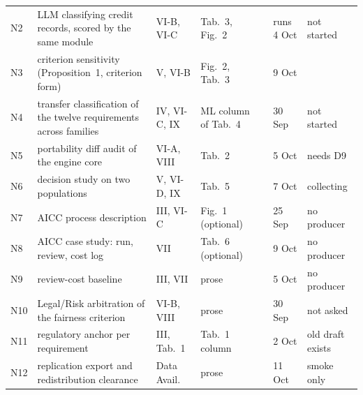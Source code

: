 {\begin{tabularx}{\textwidth}{@{}l X L{1.3cm} L{3.3cm} l L{1.1cm} L{1.5cm}@{}}
  N2 & LLM classifying credit records, scored by the same module & VI-B, VI-C & Tab.~3, Fig.~2 &  & runs 4 Oct & not started \\
  N3 & criterion sensitivity (Proposition~1, criterion form) & V, VI-B & Fig.~2, Tab.~3 &  & 9 Oct &  \\
  N4 & transfer classification of the twelve requirements across families & IV, VI-C, IX & ML column of Tab.~4 &  & 30 Sep & not started \\
  N5 & portability diff audit of the engine core & VI-A, VIII & Tab.~2 &  & 5 Oct & needs D9 \\
  N6 & decision study on two populations & V, VI-D, IX & Tab.~5 &  & 7 Oct & collecting \\
  N7 & AICC process description & III, VI-C & Fig.~1 (optional) &  & 25 Sep & no producer \\
  N8 & AICC case study: run, review, cost log & VII & Tab.~6 (optional) &  & 9 Oct & no producer \\
  N9 & review-cost baseline & III, VII & prose &  & 5 Oct & no producer \\
  N10 & Legal/Risk arbitration of the fairness criterion & VI-B, VIII & prose &  & 30 Sep & not asked \\
  N11 & regulatory anchor per requirement & III, Tab.~1 & Tab.~1 column &  & 2 Oct & old draft exists \\
  N12 & replication export and redistribution clearance & Data Avail. & prose &  & 11 Oct & smoke only \\
  \bottomrule
\end{tabularx}}
